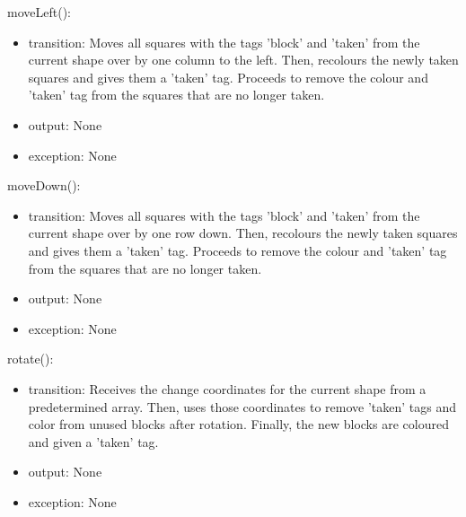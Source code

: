 \documentclass[12pt]{article}
\begin{document}
\noindent moveLeft():
\begin{itemize}
\item transition: Moves all squares with the tags 'block' and 'taken' from the current shape over by one column to the left. Then, recolours the newly taken squares and gives them a 'taken' tag. Proceeds to remove the colour and 'taken' tag from the squares that are no longer taken.
\item output: None
\item exception: None
\end{itemize}

\noindent moveDown():
\begin{itemize}
\item transition: Moves all squares with the tags 'block' and 'taken' from the current shape over by one row down. Then, recolours the newly taken squares and gives them a 'taken' tag. Proceeds to remove the colour and 'taken' tag from the squares that are no longer taken.
\item output: None
\item exception: None
\end{itemize}

\noindent rotate():
\begin{itemize}
\item transition: Receives the change coordinates for the current shape from a predetermined array. Then, uses those coordinates to remove 'taken' tags and color from unused blocks after rotation. Finally, the new blocks are coloured and given a 'taken' tag. 
\item output: None
\item exception: None
\end{itemize}

\newpage
\end{document}
